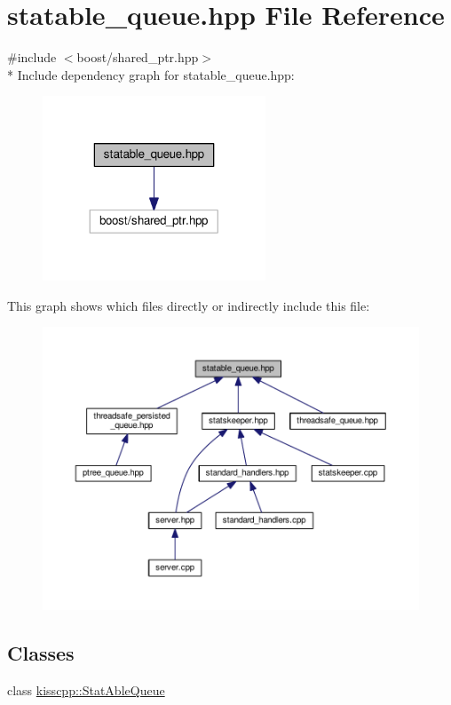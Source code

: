\hypertarget{a00080}{\section{statable\-\_\-queue.\-hpp File Reference}
\label{a00080}
}
{\ttfamily \#include $<$boost/shared\-\_\-ptr.\-hpp$>$}\\*
Include dependency graph for statable\-\_\-queue.\-hpp\-:\nopagebreak
\begin{figure}[H]
\begin{center}
\leavevmode
\includegraphics[width=188pt]{a00128}
\end{center}
\end{figure}
This graph shows which files directly or indirectly include this file\-:\nopagebreak
\begin{figure}[H]
\begin{center}
\leavevmode
\includegraphics[width=350pt]{a00129}
\end{center}
\end{figure}
\subsection*{Classes}
\begin{DoxyCompactItemize}
\item 
class \hyperlink{a00041}{kisscpp\-::\-Stat\-Able\-Queue}
\end{DoxyCompactItemize}
